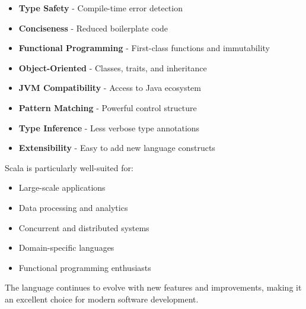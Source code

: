 \documentclass[11pt]{article}
\begin{document}
\begin{itemize}
    \item \textbf{Type Safety} - Compile-time error detection
    \item \textbf{Conciseness} - Reduced boilerplate code
    \item \textbf{Functional Programming} - First-class functions and immutability
    \item \textbf{Object-Oriented} - Classes, traits, and inheritance
    \item \textbf{JVM Compatibility} - Access to Java ecosystem
    \item \textbf{Pattern Matching} - Powerful control structure
    \item \textbf{Type Inference} - Less verbose type annotations
    \item \textbf{Extensibility} - Easy to add new language constructs
\end{itemize}

Scala is particularly well-suited for:
\begin{itemize}
    \item Large-scale applications
    \item Data processing and analytics
    \item Concurrent and distributed systems
    \item Domain-specific languages
    \item Functional programming enthusiasts
\end{itemize}

The language continues to evolve with new features and improvements, making it an excellent choice for modern software development.
\end{document}
